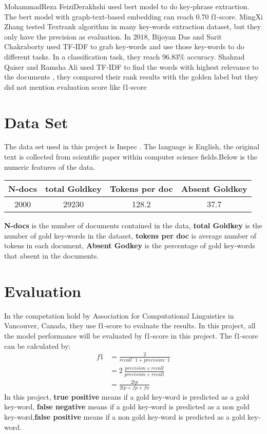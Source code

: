 \documentclass[11pt,a4paper]{article}
\begin{document}
Mohammad\text{-}Reza Feizi\text{-}Derakhshi\cite{bmo} used bert model to do key-phrase extraction. The bert model with graph-text-based embedding can reach 0.70 f1-score. 
MingXi Zhang\cite{article33} tested Textrank algorithm in many key-words extraction dataset, but they only have the precision as evaluation.
In 2018, Bijoyan Das and Sarit Chakraborty\cite{DBLP} used TF-IDF to grab key-words and use those key-words to do different tasks. In a classification task, they reach 96.83$\%$
accuracy. Shahzad Qaiser and Ramsha Ali \cite{234}used TF-IDF to find the words with highest
relevance to the documents , they compared their rank results with the golden label but they did not mention evaluation score like f1-score


\section{Data Set}
The data set used in this project is Inspec \cite{inspec}. The language is English, the original text is collected from scientific paper within computer
science fields.Below is the numeric features of the data.

\begin{center}
\begin{tabular}{cccc}
    \hline
    N-docs& total Goldkey& Tokens per doc& Absent Goldkey\\
    \hline
    2000&29230& 128.2& 37.7\\
    
    \hline
    \end{tabular}
\end{center}
\noindent
\textbf{N-docs} is the number of documents contained in the data, \textbf{total Goldkey} is the number
of gold key-words in the dataset, \textbf{tokens per doc} is average number of tokens in each document,
\textbf{Absent Godkey} is the percentage of gold key-words that absent in the documents.


\section{Evaluation}
In the competation \cite{augenstein-etal-2017-semeval}hold by Association for Computational Linguistics in Vancouver, Canada,
they use f1-score to evaluate the results. In this project, all the model performance will be evaluated by f1-score in this project.
The f1-score can be calculated by:
$$
\begin{aligned}
f1 &= \frac{2}{recall^-1+precision^-1} \\
&= 2\ \frac{precision \times recall}{precision+recall} \\
&= \frac{2tp}{2tp+fp+fn}
\end{aligned}
$$
In this project, \textbf{true positive} means if a gold key-word is predicted as a gold key-word,
\textbf{false negative} means if a gold key-word is predicted as a non gold key-word,\textbf{false positive}
means if a non gold key-word is predicted as a gold key-word.
\end{document}
